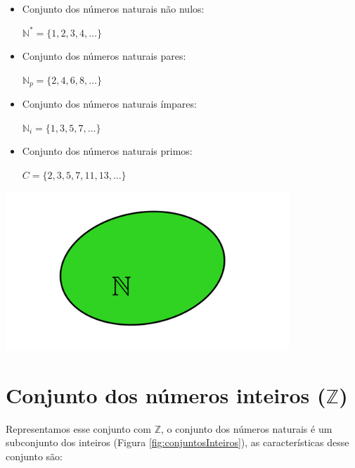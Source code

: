 \documentclass[10pt]{article}
\begin{document}
\begin{multicols}{2}
    \begin{itemize}
        \item Conjunto dos números naturais não nulos:
        
            \( \mathbb{N}^* = \{1, 2, 3, 4, \ldots \} \)
        \item Conjunto dos números naturais pares:
            
            \( \mathbb{N}_p = \{2, 4, 6, 8, \ldots \} \)
        \item Conjunto dos números naturais ímpares:
        
            \( \mathbb{N}_i = \{1, 3, 5, 7, \ldots \} \)
        \item Conjunto dos números naturais primos:
        
            \( C = \{2, 3, 5, 7, 11, 13, \ldots \} \)
        
    \end{itemize}
\columnbreak
\bigskip
\noindent
    \begin{minipage}{\linewidth}
        \centering 
        \includegraphics[width=0.8\textwidth]{imgs/conjuntosNumerico/conjuntosNaturais.pdf}
        \label{fig:conjuntosNaturais} 
    \end{minipage}%
\end{multicols} 



\section*{Conjunto dos números inteiros (\( \mathbb{Z} \))}
Representamos esse conjunto com \( \mathbb{Z}\), o conjunto dos números naturais é um subconjunto dos inteiros (Figura \ref{fig:conjuntosInteiros}), as características desse conjunto são:
\end{document}
